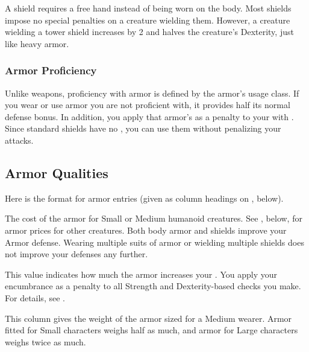         A shield requires a free hand instead of being worn on the body.
        Most shields impose no special penalties on a creature wielding them.
        However, a creature wielding a tower shield increases  by 2 and halves the creature's Dexterity, just like heavy armor.

        \subsubsection{Armor Proficiency}\label{Armor Proficiency}
            Unlike weapons, proficiency with armor is defined by the armor's usage class.
            If you wear or use armor you are not proficient with, it provides half its normal defense bonus.
            In addition, you apply that armor's  as a penalty to your  with .
            Since standard shields have no , you can use them without penalizing your attacks.

    \subsection{Armor Qualities}
        \par Here is the format for armor entries (given as column headings on , below).

         The cost of the armor for Small or Medium humanoid creatures.
        See , below, for armor prices for other creatures.
         Both body armor and shields improve your Armor defense.
        Wearing multiple suits of armor or wielding multiple shields does not improve your defenses any further.

         This value indicates how much the armor increases your .
        You apply your encumbrance as a penalty to all Strength and Dexterity-based checks you make.
        For details, see .

         This column gives the weight of the armor sized for a Medium wearer. Armor fitted for Small characters weighs half as much, and armor for Large characters weighs twice as much.

